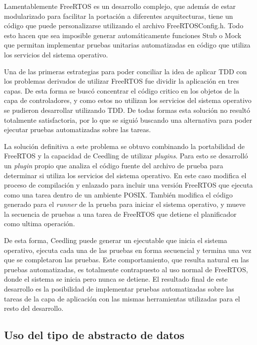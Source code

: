 Lamentablemente FreeRTOS es un desarrollo complejo, que además de estar modularizado para facilitar la portación a diferentes arquitecturas, tiene un código que puede personalizarse utilizando el archivo FreeRTOSConfig.h\cite{freertos_freertos_nodate}. Todo esto hacen que sea imposible generar automáticamente funciones Stub o Mock que permitan implementar pruebas unitarias automatizadas en código que utiliza los servicios del sistema operativo. 

Una de las primeras estrategias para poder conciliar la idea de aplicar TDD con los problemas derivados de utilizar FreeRTOS fue dividir la aplicación en tres capas. De esta forma se buscó concentrar el código critico en los objetos de la capa de controladores, y como estos no utilizan los servicios del sistema operativo se pudieron desarrollar utilizando TDD. De todas formas esta solución no resultó totalmente satisfactoria, por lo que se siguió buscando una alternativa para poder ejecutar pruebas automatizadas sobre las tareas.

La solución definitiva a este problema se obtuvo combinando la portabilidad de FreeRTOS y la capacidad de Ceedling de utilizar \emph{plugins}. Para esto se desarrolló un \emph{plugin} propio que analiza el código fuente del archivo de prueba para determinar si utiliza los servicios del sistema operativo. En este caso modifica el proceso de compilación y enlazado para incluir una versión FreeRTOS que ejecuta como una tarea dentro de un ambiente POSIX\cite{noauthor_freertos_nodate}. También modifica el código generado para el \emph{runner} de la prueba para iniciar el sistema operativo, y mueve la secuencia de pruebas a una tarea de FreeRTOS que detiene el planificador como ultima operación.

De esta forma, Ceedling puede generar un ejecutable que inicia el sistema operativo, ejecuta cada una de las pruebas en forma secuencial y termina una vez que se completaron las pruebas. Este comportamiento, que resulta natural en las pruebas automatizadas, es totalmente contrapuesto al uso normal de FreeRTOS, donde el sistema se inicia pero nunca se detiene. El resultado final de este desarrollo es la posibilidad de implementar pruebas automatizadas sobre las tareas de la capa de aplicación con las mismas herramientas utilizadas para el resto del desarrollo.

\subsection{Uso del tipo de abstracto de datos}

